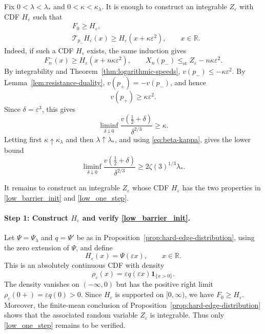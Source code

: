 \documentclass[12pt]{amsart}
\numberwithin{equation}{section}
\theoremstyle{plain}
\theoremstyle{definition}
\newcommand{\stle}{\le_{\mathrm{st}}}
\begin{document}
Fix $0<\lambda<\lambda_*$ and $0<\kappa<\kappa_{\lambda}$.  It is enough to construct an
integrable \(Z_\varepsilon\) with CDF \(H_\varepsilon\) such that
\begin{align}
 &F_0\ge H_\varepsilon, \label{low_barrier_init}\\
 &\mathcal T_{p_-}H_\varepsilon(x)
 \ge H_\varepsilon(x+\kappa\varepsilon^2),
 \qquad x\in\mathbb R.\label{low_one_step}
\end{align}
Indeed, if such a CDF $H_\varepsilon$ exists, the same induction gives
\[
 F_n^-(x)\ge H_\varepsilon(x+n\kappa\varepsilon^2),
 \qquad
 X_n(p_-)\stle Z_\varepsilon-n\kappa\varepsilon^2.
\]
By integrability and Theorem~\ref{thm:logarithmic-speeds},
$v(p_-)\le-\kappa\varepsilon^2$.
By Lemma~\ref{lem:resistance-duality},
$v(p_+)=-v(p_-)$, and hence
\[
 v(p_+)\ge\kappa\varepsilon^2.
\]
Since $\delta=\varepsilon^3$, this gives
\[
 \liminf_{\delta\downarrow0}
 \frac{v(\frac12+\delta)}{\delta^{2/3}}
 \ge\kappa.
\]
Letting first $\kappa\uparrow\kappa_{\lambda}$ and then
$\lambda\uparrow\lambda_*$, and using \eqref{eq:beta-kappa},
gives the lower bound
\begin{equation}
 \liminf_{\delta\downarrow0}
 \frac{v(\frac12+\delta)}{\delta^{2/3}}
 \ge2\zeta(3)^{1/3}\lambda_*.
 \label{eq:sharp-lower-bound}
\end{equation}

It remains to construct an integrable $Z_\varepsilon$ whose CDF
$H_\varepsilon$ has the two properties in \eqref{low_barrier_init} and \eqref{low_one_step}.


\paragraph*{Step 1: Construct $H_\varepsilon$ and verify \eqref{low_barrier_init}.}
Let $\Psi=\Psi_{\lambda}$ and $q=\Psi'$ be as in
Proposition~\ref{prop:hard-edge-distribution}, using the zero extension of
$\Psi$, and define
\[
H_\varepsilon(x)=\Psi(\varepsilon x),\qquad x\in\mathbb R.
\]
This is an absolutely continuous CDF
with density
\[
\rho_\varepsilon(x)
=\varepsilon q(\varepsilon x)\mathbf 1_{\{x>0\}}.
\]
The density vanishes on $(-\infty,0)$
but has the positive right limit
$\rho_\varepsilon(0+)=\varepsilon q(0)>0$.
Since $H_\varepsilon$ is supported on $[0,\infty)$, we have $F_0\ge H_\varepsilon$.
Moreover, the finite-mean conclusion of
Proposition~\ref{prop:hard-edge-distribution} shows that the associated random
variable $Z_\varepsilon$ is integrable.  Thus only \eqref{low_one_step} remains to be verified.
\end{document}
